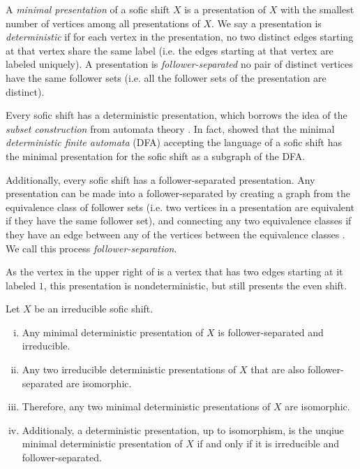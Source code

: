 \documentclass[hidelinks]{report}
\newcommand{\Gc}{\mathcal{G}}  %
\newcommand{\term}[1]{\textit{#1}}
\theoremstyle{definition}
\begin{document}
A \term{minimal presentation} of a sofic shift \(X\) is a presentation 
of \(X\) with the smallest number of vertices among all presentations of \(X\). 
We say a presentation is \term{deterministic} if for each vertex in the presentation,
no two distinct edges starting at that vertex share the same label (i.e. the edges 
starting at that vertex are labeled uniquely). A presentation 
is \term{follower-separated} no pair of distinct vertices have the same follower 
sets (i.e. all the follower sets of the presentation are distinct). 

Every sofic shift has a deterministic presentation, which borrows the idea of the
\term{subset construction} from automata theory \cite{hopcroft2001introduction}.
In fact, \cite{jonoska1996sofic} showed that the minimal \term{deterministic finite 
automata} (DFA) accepting the 
language of a sofic shift has the minimal presentation for the 
sofic shift as a subgraph of the DFA. 

Additionally, every sofic shift has a follower-separated presentation. 
Any presentation can be made into a follower-separated by creating 
a graph from the equivalence class of follower sets (i.e. two vertices 
in a presentation are equivalent if they have the same follower set), 
and connecting any two equivalence classes if they have an edge 
between any of the vertices between the equivalence classes \cite{lind1995introduction}.
We call this process \term{follower-separation}.

\begin{example}
    As the vertex in the upper right of  
    is a vertex that has two edges starting at it labeled \(1\),
    this presentation is nondeterministic, but still presents 
    the even shift.
\end{example}

\begin{theorem}[name=\cite{lind1995introduction} Fundamental theorem of minimal deterministic presentations of irreducible sofic shifts]\label{fundamental}
    Let \(X\) be an irreducible sofic shift.
    \begin{enumerate}[(i)]
        \item Any minimal deterministic presentation of \(X\) is follower-separated and irreducible.
        \item Any two irreducible deterministic presentations of \(X\) 
        that are also follower-\\separated are isomorphic.
        \item Therefore, any two minimal deterministic presentations of \(X\) are isomorphic.
        \item Additionaly, a deterministic presentation, up to isomorphism, is the unqiue minimal deterministic presentation of \(X\)
        if and only if it is irreducible and follower-separated.
    \end{enumerate}
\end{theorem}
\end{document}
